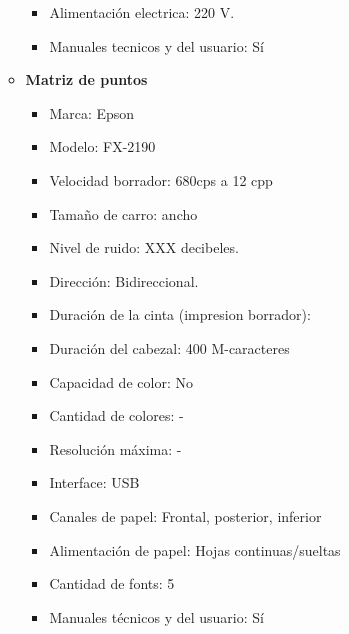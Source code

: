 \begin{enumerate}
\begin{itemize}
\begin{itemize}
      \item Alimentación electrica: 220 V.
      \item Manuales tecnicos y del usuario: Sí
    \end{itemize}
    
    \item \textbf{Matriz de puntos}
    \begin{itemize}
      \item Marca: Epson
      \item Modelo: FX-2190
      \item Velocidad borrador: 680cps a 12 cpp
      \item Tamaño de carro: ancho
      \item Nivel de ruido: XXX decibeles.
      \item Dirección: Bidireccional.
      \item Duración de la cinta (impresion borrador):
      \item Duración del cabezal: 400 M-caracteres
      
      \item Capacidad de color: No
      \item Cantidad de colores: -
      \item Resolución máxima: -
      
      \item Interface: USB
      
      \item Canales de papel: Frontal, posterior, inferior
      \item Alimentación de papel: Hojas continuas/sueltas
      
      \item Cantidad de fonts: 5
      
      \item Manuales técnicos y del usuario: Sí
    \end{itemize}
    
  \end{itemize}
\end{enumerate} 
